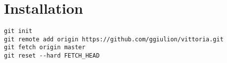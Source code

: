 \documentclass{article}
\begin{document}
\section{Installation}

\begin{verbatim}
git init
git remote add origin https://github.com/ggiulion/vittoria.git
git fetch origin master
git reset --hard FETCH_HEAD
\end{verbatim}
\end{document}
